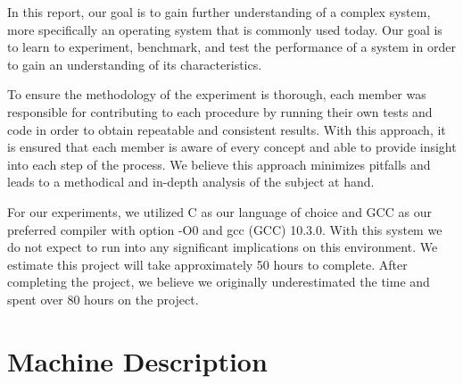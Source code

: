 In this report, our goal is to gain further understanding of a complex system, more specifically an operating system that is commonly used today. Our goal is to learn to experiment, benchmark, and test the performance of a system in order to gain an understanding of its characteristics.

To ensure the methodology of the experiment is thorough, each member was responsible for contributing to each procedure by running their own tests and code in order to obtain repeatable and consistent results. With this approach, it is ensured that each member is aware of every concept and able to provide insight into each step of the process. We believe this approach minimizes pitfalls and leads to a methodical and in-depth analysis of the subject at hand.

For our experiments, we utilized C as our language of choice and GCC as our preferred compiler with option -O0 and gcc (GCC) 10.3.0. With this system we do not expect to run into any significant implications on this environment. We estimate this project will take approximately 50 hours to complete. After completing the project, we believe we originally underestimated the time and spent over 80 hours on the project.

\section{Machine Description}

